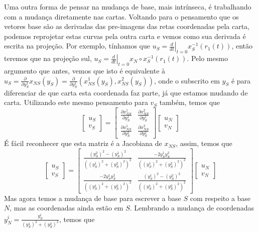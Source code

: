 \documentclass[a4paper,12pt,notitlepage]{article}
\begin{document}
	Uma outra forma de pensar na mudança de base, mais intrínseca, é trabalhando com a mudança diretamente nas cartas. Voltando para o pensamento que os vetores base são as derivadas das pre-imagens das retas coordenadas pela carta, podemos reprojetar estas curvas pela outra carta e vemos como sua derivada é escrita na projeção. Por exemplo, tínhamos que $u_S=\left.\frac{d}{dt}\right|_{t=0}x_S^{-1}(r_1(t))$, então teremos que na projeção sul, $u_S=\left.\frac{d}{dt}\right|_{t=0}x_N\circ x_S^{-1}(r_1(t))$. Pelo mesmo argumento que antes, vemos que isto é equivalente à $u_S=\frac{\partial}{\partial y_S^1}x_{NS}(y_S)=\frac{\partial}{\partial y_S^1}(x_{NS}^1(y_S),x_{NS}^2(y_S))$, onde o subscrito em $y_S$ é para diferenciar de que carta esta coordenada faz parte, já que estamos mudando de carta. Utilizando este mesmo pensamento para $v_S$ também, temos que
	\begin{equation}
		\begin{bmatrix}
		u_S\\v_S
		\end{bmatrix}=\begin{bmatrix}
		\frac{\partial x_{NS}^1}{\partial y_S^1} & \frac{\partial x_{NS}^2}{\partial y_S^1}\\
		\frac{\partial x_{NS}^1}{\partial y_S^2} & \frac{\partial x_{NS}^2}{\partial y_S^2}
		\end{bmatrix}\begin{bmatrix}
		u_N\\v_N
		\end{bmatrix}
	\end{equation}
	É fácil reconhecer que esta matriz é a Jacobiana de $x_{NS}$, assim, temos que
	\begin{equation}
		\begin{bmatrix}
		u_S\\v_S
		\end{bmatrix}=\begin{bmatrix}
		\frac{(y_S^2)^2-(y_S^1)^2}{((y_S^1)^2+(y_S^2)^2)^2} & \frac{-2y_S^1y_S^2}{((y_S^1)^2+(y_S^2)^2)^2}\\
		\frac{-2y_S^1y_S^2}{((y_S^1)^2+(y_S^2)^2)^2} & \frac{(y_S^1)^2-(y_S^2)^2}{((y_S^1)^2+(y_S^2)^2)^2}
		\end{bmatrix}\begin{bmatrix}
		u_N\\v_N
		\end{bmatrix}
	\end{equation}
	Mas agora temos a mudança de base para escrever a base $S$ com respeito a base $N$, mas as coordenadas ainda estão em $S$. Lembrando a mudança de coordenadas $y_N^i=\frac{y_S^i}{(y_S^1)^2+(y_S^2)^2}$, temos que
\end{document}

